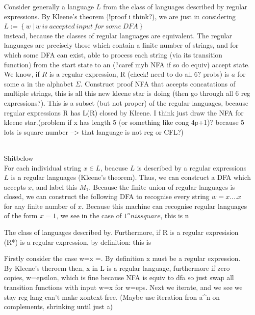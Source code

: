 {Consider generally a language $L$ from the class of languages described by regular expressions. By Kleene's theorem (!proof i think?), we are just in considering 
\\$L:=\left\{ w\  |\  w\  is\  accepted\  input\  for\  some\  DFA\right\}  $
\\
instead, because the classes of regular languages are equivalent. The regular languages are precisely those which contain a finite number of strings, and for which some DFA can exist, able to process each string (via its transition function) from the start state to an (?caref myb NFA if so do equiv) accept state. We know, if $R$ is a regular expression, R (check! need to do all 6? probs) is $a$ for some $a$ in the alphabet $\Sigma$. Construct proof NFA that accepts concatations of multiple strings, this is all this new kleene star is doing (then go through all 6 reg expressions?). This is a subset (but not proper) of the regular languages, because regular expressions R has L(R) closed by Kleene. I think just draw the NFA for kleene star.(problem if x has length 5 (or something like cong 4p+1)? because 5 lots is square number --> that language is not reg or CFL?)  


\\
Shitbelow
\\
For each individual string $x \in L$, beacuse $L$ is described by a  regular expressions $L$ is a regular languages (Kleene's theorem). Thus, we can construct a DFA which accepts $x$, and label this $M_{1}$. Because the finite union of regular languages is closed, we can construct the following DFA to recognise every string $w=x....x$ for any finite number of $x$. Because this machine can recognise regular languages of the form $x=1$, we see in the case of $1^{n} n is square$, this is n 



The class of languages described by. Furthermore, if R is a regular expresision (R*) is a regular expression, by definition: this is  



Firstly consider the case w=x =. By definition x must be a regular expression. By Kleene's theroem then, x in L is a regular language, furthermore if zero copies, w=epsilon, which is fine because NFA is equiv to dfa so just swap all transition functions with input w=x for w=eps. Next we iterate, and we see we stay reg lang can't make xontext free. (Maybe use iteration fron a^n on complements, shrinking until just {a})







}
